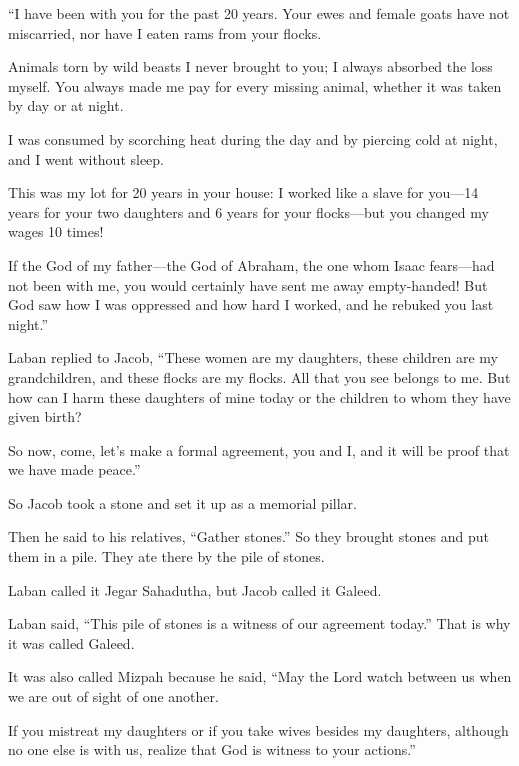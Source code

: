 \begin{scripture}
 ``I have been with you for the past 20 years. Your ewes and female goats have not miscarried, nor have I eaten rams from your flocks.
 Animals torn by wild beasts I never brought to you; I always absorbed the loss myself. You always made me pay for every missing animal, whether it was taken by day or at night.
 I was consumed by scorching heat during the day and by piercing cold at night, and I went without sleep.
 This was my lot for 20 years in your house: I worked like a slave for you---14 years for your two daughters and 6 years for your flocks---but you changed my wages 10 times!
 If the God of my father---the God of Abraham, the one whom Isaac fears---had not been with me, you would certainly have sent me away empty-handed! But God saw how I was oppressed and how hard I worked, and he rebuked you last night.''
\everypar{}

 Laban replied to Jacob, ``These women are my daughters, these children are my grandchildren, and these flocks are my flocks. All that you see belongs to me. But how can I harm these daughters of mine today or the children to whom they have given birth?
 So now, come, let's make a formal agreement, you and I, and it will be proof that we have made peace.''
\everypar{}

 So Jacob took a stone and set it up as a memorial pillar.
 Then he said to his relatives, ``Gather stones.'' So they brought stones and put them in a pile. They ate there by the pile of stones.
 Laban called it Jegar Sahadutha, but Jacob called it Galeed.
\everypar{}

 Laban said, ``This pile of stones is a witness of our agreement today.'' That is why it was called Galeed.
 It was also called Mizpah because he said, ``May the Lord watch between us when we are out of sight of one another.
 If you mistreat my daughters or if you take wives besides my daughters, although no one else is with us, realize that God is witness to your actions.''
\everypar{}


\end{scripture}
